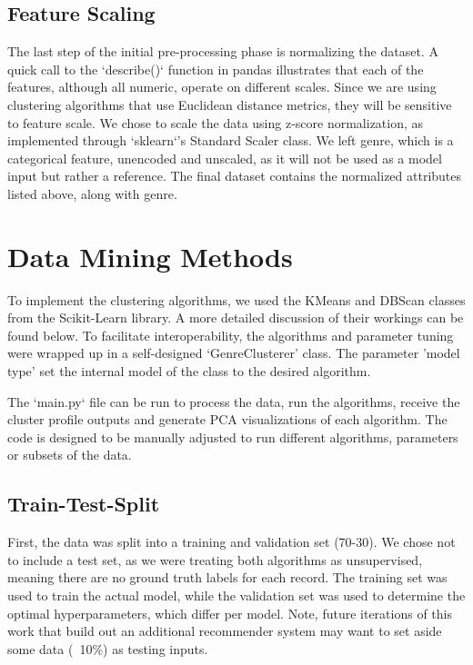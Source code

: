 \documentclass[conference]{IEEEtran}
\begin{document}
\subsection{Feature Scaling}
The last step of the initial pre-processing phase is normalizing the dataset. A quick call to the `describe()` function in pandas illustrates that each of the features, although all numeric, operate on different scales. Since we are using clustering algorithms that use Euclidean distance metrics, they will be sensitive to feature scale. We chose to scale the data using z-score normalization, as implemented through `sklearn`'s Standard Scaler class. We left genre, which is a categorical feature, unencoded and unscaled, as it will not be used as a model input but rather a reference. The final dataset contains the normalized attributes listed above, along with genre. 


\section{Data Mining Methods}
 To implement the clustering algorithms, we used the KMeans and DBScan classes from the Scikit-Learn library. A more detailed discussion of their workings can be found below. To facilitate interoperability, the algorithms and parameter tuning were wrapped up in a self-designed ‘GenreClusterer’ class. The parameter 'model type' set the internal model of the class to the desired algorithm.  

 The `main.py` file can be run to process the data, run the algorithms, receive the cluster profile outputs and generate PCA visualizations of each algorithm. The code is designed to be manually adjusted to run different algorithms, parameters or subsets of the data.

\subsection{Train-Test-Split}
First, the data was split into a training and validation set (70-30). We chose not to include a test set, as we were treating both algorithms as unsupervised, meaning there are no ground truth labels for each record. The training set was used to train the actual model, while the validation set was used to determine the optimal hyperparameters, which differ per model. Note, future iterations of this work that build out an additional recommender system may want to set aside some data (~10\%) as testing inputs.
\end{document}
